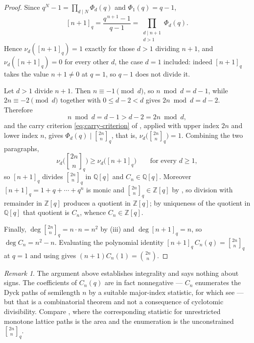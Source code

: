 \documentclass[11pt,oneside,openany]{book}
\theoremstyle{definition}
\theoremstyle{remark}
\newtheorem{remark}[remark]{Remark}
\newcommand{\qbinom}[2]{\genfrac{[}{]}{0pt}{}{#1}{#2}_{q}}
\newcommand{\qint}[1]{[#1]_q}
\newcommand{\Q}{\mathbb Q}
\newcommand{\Z}{\mathbb Z}
\begin{document}
\begin{proof}
Since $q^{N}-1=\prod_{d\mid N}\Phi_d(q)$ and $\Phi_1(q)=q-1$,
\[
 \qint{n+1}=\frac{q^{\,n+1}-1}{q-1}
 =\prod_{\substack{d\mid n+1\\ d>1}}\Phi_d(q).
\]
Hence $\nu_d(\qint{n+1})=1$ exactly for those $d>1$ dividing $n+1$, and
$\nu_d(\qint{n+1})=0$ for every other $d$, the case $d=1$ included: indeed
$\qint{n+1}$ takes the value $n+1\ne0$ at $q=1$, so $q-1$ does not divide it.

Let $d>1$ divide $n+1$.  Then $n\equiv-1\pmod d$, so $n\bmod d=d-1$, while
$2n\equiv-2\pmod d$ together with $0\le d-2<d$ gives $2n\bmod d=d-2$.
Therefore
\[
 n\bmod d=d-1>d-2=2n\bmod d,
\]
and the carry criterion \eqref{eq:carry-criterion} of
, applied with upper index $2n$ and lower
index $n$, gives $\Phi_d(q)\mid\qbinom{2n}{n}$, that is,
$\nu_d\bigl(\qbinom{2n}{n}\bigr)=1$.  Combining the two paragraphs,
\[
 \nu_d\bigl(\qbinom{2n}{n}\bigr)\ge\nu_d\bigl(\qint{n+1}\bigr)
 \qquad\text{for every }d\ge1,
\]
so $\qint{n+1}$ divides $\qbinom{2n}{n}$ in $\Q[q]$ and $C_n\in\Q[q]$.
Moreover $\qint{n+1}=1+q+\cdots+q^{n}$ is monic and
$\qbinom{2n}{n}\in\Z[q]$ by , so division with remainder
in $\Z[q]$ produces a quotient in $\Z[q]$; by uniqueness of the quotient in
$\Q[q]$ that quotient is $C_n$, whence $C_n\in\Z[q]$.

Finally, $\deg\qbinom{2n}{n}=n\cdot n=n^2$ by
(iii) and $\deg\qint{n+1}=n$, so
$\deg C_n=n^2-n$.  Evaluating the polynomial identity
$\qint{n+1}\,C_n(q)=\qbinom{2n}{n}$ at $q=1$ and using
 gives $(n+1)C_n(1)=\binom{2n}{n}$.
\end{proof}

\begin{remark}\label{rem:q-catalan-positivity}
The argument above establishes integrality and says nothing about signs.  The
coefficients of $C_n(q)$ are in fact nonnegative --- $C_n$ enumerates the
Dyck paths of semilength $n$ by a suitable major-index statistic, for which
see \cite{Stanley1999} --- but that is a combinatorial theorem and not a
consequence of cyclotomic divisibility.  Compare , where
the corresponding statistic for unrestricted monotone lattice paths is the
area and the enumeration is the unconstrained $\qbinom{2n}{n}$.
\end{remark}
\end{document}
